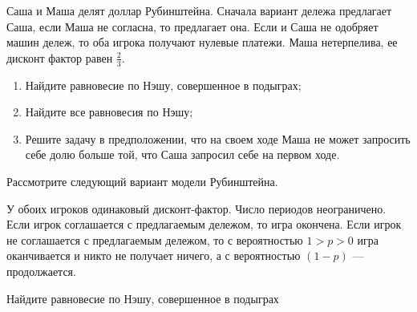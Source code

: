 \begin{problem}
\begin{source}
 [LSE, 1998]\end{source}
Саша и Маша делят доллар Рубинштейна. Сначала вариант дележа предлагает Саша, если Маша не согласна, то предлагает она. Если и Саша не одобряет машин дележ, то оба игрока получают нулевые платежи. Маша нетерпелива, ее дисконт фактор равен  $\frac{2}{3} $.\par
\begin{enumerate}
\item  Найдите равновесие по Нэшу, совершенное в подыграх;\par
\item Найдите все равновесия по Нэшу;\par
\item  Решите задачу в предположении, что на своем ходе Маша не может запросить себе долю больше той, что Саша запросил себе на первом ходе.
\end{enumerate}


\begin{sol}

\end{sol}
\end{problem}



\begin{problem}
 Рассмотрите следующий вариант модели Рубинштейна. \par %
У обоих игроков одинаковый дисконт-фактор. Число периодов
неограничено. Если игрок соглашается с предлагаемым дележом, то
игра окончена. Если игрок не соглашается с предлагаемым дележом,
то с вероятностью $1>p>0$ игра оканчивается и никто не получает
ничего, а с вероятностью $(1-p)$ --- продолжается. \par
Найдите равновесие по Нэшу, совершенное в подыграх



\begin{sol}

\end{sol}
\end{problem}



